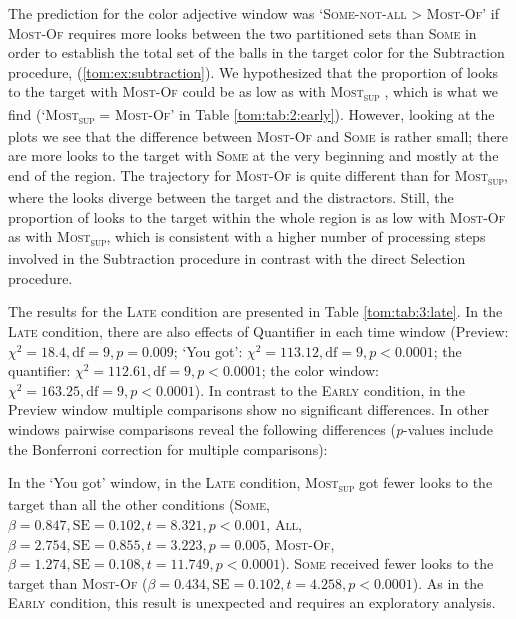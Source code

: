 \documentclass[output=paper]{langscibook}
\begin{document}
The prediction for the color adjective window was `\textsc{Some-not-all} {\textgreater} \textsc{Most-Of}' if \textsc{Most-Of} requires more looks between the two partitioned sets than \textsc{Some} in order to establish the total set of the balls in the target color for the Subtraction procedure, (\ref{tom:ex:subtraction}). We hypothesized that the proportion of looks to the target with
\textsc{Most-Of} could be as low as with \textsc{Most\textsubscript{sup}}\textit{ }, which is what we find
(`\textsc{Most\textsubscript{sup}} = \textsc{Most-Of}' in Table \ref{tom:tab:2:early}). However, looking at the plots we see that the
difference between \textsc{Most-Of }and \textsc{Some }is rather small; there are more looks to the target with\textsc{
Some} at the very beginning and mostly at the end of the region. The trajectory for \textsc{Most-Of }is quite different
than for \textsc{Most\textsubscript{sup}}, where the looks diverge between the target and the distractors.
Still, the proportion of looks to the target within the whole region is as low with \textsc{Most-Of }as with
\textsc{Most\textsubscript{sup}}, which is consistent with a higher number of processing steps involved in the
Subtraction procedure in contrast with the direct Selection procedure.

The results for the \textsc{Late} condition are presented in Table \ref{tom:tab:3:late}. In the \textsc{Late} condition, there are also effects of Quantifier in each time window (Preview: $\chi^2=18.4, \text{df}=9, p=0.009$; `You got': $\chi^2=113.12, \text{df}=9,
p<0.0001$; the quantifier: $\chi^2=112.61, \text{df}=9, p<0.0001$; the color window:
$\chi^2=163.25, \text{df}=9, p<0.0001$). In contrast to the \textsc{Early} condition, in the Preview window multiple
comparisons show no significant differences. In other windows pairwise comparisons reveal the following differences
(\textit{p}{}-values include the Bonferroni correction for multiple comparisons):

In the `You got' window, in the \textsc{Late} condition, \textsc{Most\textsubscript{sup}} got fewer looks to the target than all
the other conditions (\textsc{Some}, $\beta =0.847, \text{SE}=0.102, t=8.321, p<0.001$,
\textsc{All}, $\beta =2.754, \text{SE}=0.855, t=3.223, p=0.005$, \textsc{Most-Of}, $\beta =1.274, \text{SE}=0.108,
t=11.749, p<0.0001$). \textsc{Some} received fewer looks to the target than \textsc{Most-Of} ($\beta
=0.434, \text{SE}=0.102, t=4.258, p<0.0001$). As in the \textsc{Early} condition, this result is unexpected
and requires an exploratory analysis. 
\end{document}
